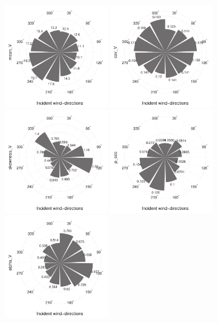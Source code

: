\begin{figure}[H] 
	\centering    
	\includegraphics[width=0.4\textwidth]{images/Schiphol_mean_V_test.pdf}
	\includegraphics[width=0.4\textwidth]{images/Schiphol_cov_V_test.pdf}
	\includegraphics[width=0.4\textwidth]{images/Schiphol_skewness_V_test.pdf}
	\includegraphics[width=0.4\textwidth]{images/Schiphol_p_sec_test.pdf}
	\includegraphics[width=0.4\textwidth]{images/Schiphol_alpha_V_test.pdf}

\end{figure}
